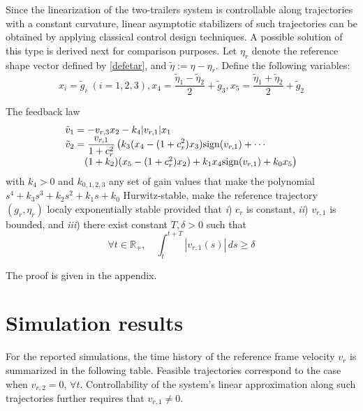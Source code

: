 \documentclass[a4paper,twoside]{article}
\def \RR {{\mathbb R}}
\newcommand{\tnm}[1]{\textnormal{#1}}
\begin{document}
Since the linearization of the two-trailers system is controllable along trajectories with a constant curvature, linear asymptotic 
stabilizers of such trajectories can be obtained by applying classical control design techniques. A possible solution of this type 
is derived next for comparison purposes. Let $\eta_r$ denote the reference shape vector defined by \eqref{defetar},
and $\tilde{\eta}:=\eta-\eta_r$. Define the following variables:
\begin{equation}
\label{defcv}
x_i= \tilde g_i \; (i=1,2,3), x_4= \frac{\tilde \eta_1- \tilde \eta_2}{2} + \tilde g_3,
x_5= \frac{\tilde \eta_1+ \tilde \eta_2}{2} + \tilde g_2
\end{equation}

\begin{proposition}
\label{prop2}
The feedback law
\begin{equation}
\label{linear-control}
\begin{array}{l}
\tilde v_1=  - v_{r,3} x_2 - k_4 |v_{r,1}| x_1 \\
\displaystyle \tilde v_2 = \frac{v_{r,1}}{1+ c_r^2} \left (k_3 (x_4 -(1+c_r^2)x_3)\tnm{sign}(v_{r,1}) 
+ \cdots \right. \\
\phantom{toto} \left. (1+k_2) (x_5 -(1+c_r^2) x_2) +k_1 x_4 \tnm{sign}(v_{r,1}) + k_0 x_5 \right)
\end{array}
\end{equation}
with $k_4>0$ and $k_{0,1,2,3}$ any  set of gain values that make the polynomial $s^4+k_3s^3+k_2 s^2 + k_1 s + k_0$ 
Hurwitz-stable, make the reference trajectory $(g_r,\eta_r)$ localy exponentially stable provided that {\it i})
$c_r$ is constant, {\it ii}) $v_{r,1}$ is bounded, and {\it iii}) there exist constant $T, \delta>0$ such that
\begin{equation}
\label{persist}
\forall t \in \RR_{+}, \quad \int_t^{t+T} |v_{r,1}(s)| \, ds \geq \delta
\end{equation}
\end{proposition}
\noindent The proof is given in the appendix.

\section{Simulation results}
\label{sec-simu}


For the reported simulations, the time history of the reference frame velocity $v_r$ 
is summarized in the following table. Feasible trajectories correspond to the case when $v_{r,2}=0$, $\forall t$. Controllability of the system's linear approximation along such trajectories further requires that $v_{r,1} \neq 0$. 
\vspace{.2cm}
\end{document}
